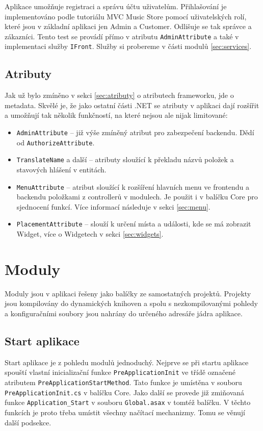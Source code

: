 \documentclass[11pt,twoside,a4paper]{book}
\begin{document}
Aplikace umožňuje registraci a správu účtu uživatelům. Přihlašování je implementováno podle tutoriálu MVC Music Store \cite{musicstore} pomocí uživatelských rolí, které jsou v základní aplikaci jen \textsf{Admin} a \textsf{Customer}. Odlišuje se tak správce a zákazníci. Tento test se provádí přímo v atributu \texttt{AdminAttribute} a také v implementaci služby \texttt{IFront}. Služby si probereme v části modulů \ref{sec:services}.

\subsection{Atributy}

Jak už bylo zmíněno v sekci \ref{sec:atributy} o atributech frameworku, jde o metadata. Skvělé je, že jako ostatní části .NET se atributy v aplikaci dají rozšířit a umožňují tak několik funkčností, na které nejsou ale nijak limitované:

\begin{itemize}
\item \texttt{AdminAttribute} -- již výše zmíněný atribut pro zabezpečení backendu. Dědí od \texttt{Authorize\-Attribute}.
\item \texttt{TranslateName} a další -- atributy sloužící k překladu názvů položek  a stavových hlášení v entitách.
\item \texttt{MenuAttribute} -- atribut sloužící k rozšíření hlavních menu ve frontendu a backendu položkami z controllerů v modulech. Je použit i v balíčku \textsf{Core} pro sjednocení funkcí. Více informací následuje v sekci \ref{sec:menu}.
\item \texttt{PlacementAttribute} -- slouží k určení místa a události, kde se má zobrazit \textsf{Widget}, více o Widgetech v sekci \ref{sec:widgets}.
\end{itemize}


\section{Moduly}
\label{sec:moduly}
Moduly jsou v aplikaci řešeny jako balíčky ze samostatných projektů. Projekty jsou kompilovány do dynamických knihoven a spolu s nezkompilovanými pohledy a konfiguračními soubory jsou nahrány do určeného adresáře jádra aplikace. 

\subsection{Start aplikace}
\label{sec:startapp}
Start aplikace je z pohledu modulů jednoduchý. Nejprve se při startu aplikace spouští vlastní inicializační funkce \texttt{PreApplicationInit} ve třídě označené atributem \texttt{Pre\-Application\-Start\-Method}. Tato funkce je umístěna v souboru \texttt{PreApplicationInit.cs} v balíčku \textsf{Core}. Jako další se provede již zmiňovaná funkce \texttt{Application\_Start} v souboru \texttt{Global.asax} v tomtéž balíčku. V těchto funkcích je proto třeba umístit všechny načítací mechanizmy. Tomu se věnují další podsekce.
\end{document}
